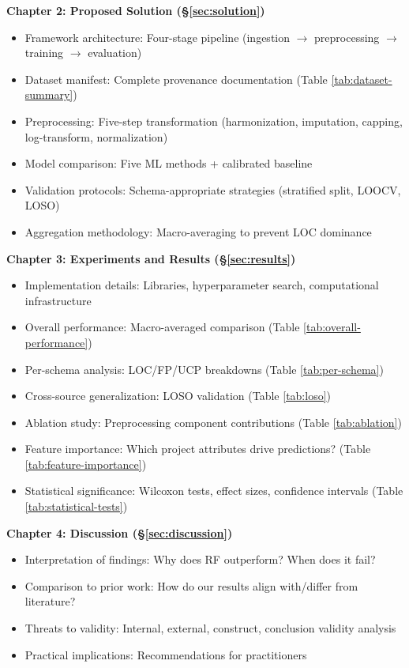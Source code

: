 \documentclass[11pt,a4paper]{article}
\begin{document}
\textbf{Chapter 2: Proposed Solution (\S\ref{sec:solution})}
\begin{itemize}
    \item Framework architecture: Four-stage pipeline (ingestion $\to$ preprocessing $\to$ training $\to$ evaluation)
    \item Dataset manifest: Complete provenance documentation (Table \ref{tab:dataset-summary})
    \item Preprocessing: Five-step transformation (harmonization, imputation, capping, log-transform, normalization)
    \item Model comparison: Five ML methods + calibrated baseline
    \item Validation protocols: Schema-appropriate strategies (stratified split, LOOCV, LOSO)
    \item Aggregation methodology: Macro-averaging to prevent LOC dominance
\end{itemize}

\textbf{Chapter 3: Experiments and Results (\S\ref{sec:results})}
\begin{itemize}
    \item Implementation details: Libraries, hyperparameter search, computational infrastructure
    \item Overall performance: Macro-averaged comparison (Table \ref{tab:overall-performance})
    \item Per-schema analysis: LOC/FP/UCP breakdowns (Table \ref{tab:per-schema})
    \item Cross-source generalization: LOSO validation (Table \ref{tab:loso})
    \item Ablation study: Preprocessing component contributions (Table \ref{tab:ablation})
    \item Feature importance: Which project attributes drive predictions? (Table \ref{tab:feature-importance})
    \item Statistical significance: Wilcoxon tests, effect sizes, confidence intervals (Table \ref{tab:statistical-tests})
\end{itemize}

\textbf{Chapter 4: Discussion (\S\ref{sec:discussion})}
\begin{itemize}
    \item Interpretation of findings: Why does RF outperform? When does it fail?
    \item Comparison to prior work: How do our results align with/differ from literature?
    \item Threats to validity: Internal, external, construct, conclusion validity analysis
    \item Practical implications: Recommendations for practitioners
\end{itemize}
\end{document}
